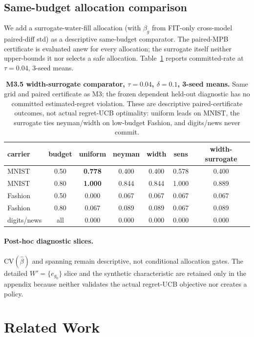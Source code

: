 \documentclass{article}
\begin{document}
\subsection{Same-budget allocation comparison}
We add a surrogate-water-fill allocation (with $\beta_g$ from FIT-only cross-model paired-diff
std) as a descriptive same-budget comparator. The paired-MPB certificate is evaluated anew for
every allocation; the surrogate itself neither upper-bounds it nor selects a safe allocation.
Table~\ref{tab:m35} reports committed-rate at $\tau{=}0.04$, 3-seed means.
\FloatBarrier
\begin{table}[H]
\centering\small\setlength{\tabcolsep}{4pt}
\begin{tabular}{lcccccc}
\toprule
carrier & budget & uniform & neyman & width & sens & width-surrogate \\
\midrule
MNIST & 0.50 & \textbf{0.778} & 0.400 & 0.400 & 0.578 & 0.400 \\
MNIST & 0.80 & \textbf{1.000} & 0.844 & 0.844 & 1.000 & 0.889 \\
Fashion & 0.50 & 0.000 & 0.067 & 0.067 & 0.067 & 0.067 \\
Fashion & 0.80 & 0.067 & 0.089 & 0.089 & 0.067 & 0.089 \\
digits/news & all & 0.000 & 0.000 & 0.000 & 0.000 & 0.000 \\
\bottomrule
\end{tabular}
\caption{\textbf{M3.5 width-surrogate comparator, $\tau{=}0.04$, $\delta{=}0.1$, 3-seed means.}
Same grid and paired certificate as M3; the frozen dependent held-out diagnostic has no
committed estimated-regret violation. These are descriptive paired-certificate outcomes, not actual regret-UCB optimality: uniform leads on
MNIST, the surrogate ties neyman/width on low-budget Fashion, and digits/news never commit.
}
\label{tab:m35}
\end{table}

\paragraph{Post-hoc diagnostic slices.} $\mathrm{CV}(\hat\beta)$ and spanning remain
descriptive, not conditional allocation gates. The detailed $W'=\{e_{g_0}\}$ slice and the
synthetic characteristic are retained only in the appendix because neither validates the actual
regret-UCB objective nor creates a policy.

\section{Related Work}
\label{sec:related}
\end{document}
